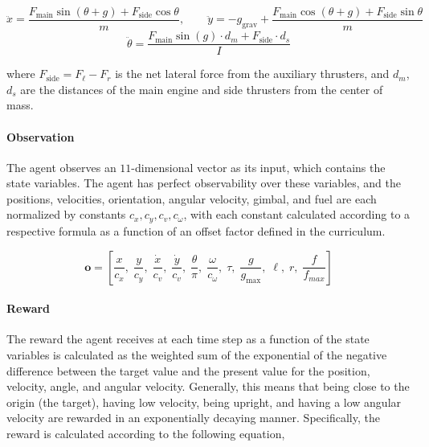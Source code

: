\documentclass{article}
\begin{document}
\begin{equation}
    \ddot{x} = \frac{F_\text{main} \sin(\theta + g) + F_\text{side} \cos\theta}{m}, \qquad
    \ddot{y} = -g_\text{grav} + \frac{F_\text{main} \cos(\theta + g) + F_\text{side} \sin\theta}{m}
    \label{eq:dynamics_xy}
\end{equation}
\begin{equation}
    \ddot{\theta} = \frac{F_\text{main} \sin(g) \cdot d_m + F_\text{side} \cdot d_s}{I}
    \label{eq:dynamics_theta}
\end{equation}

where $F_\text{side} = F_\ell - F_r$ is the net lateral force from the auxiliary thrusters, and $d_m$, $d_s$ are the distances of the main engine and side thrusters from the center of mass.

\paragraph{Observation}

The agent observes an $11$-dimensional vector as its input, which contains the state variables. The agent has perfect observability over these variables, and the positions, velocities, orientation, angular velocity, gimbal, and fuel are each normalized by constants $c_x, c_y, c_v, c_{\omega}$, with each constant calculated according to a respective formula as a function of an offset factor defined in the curriculum.

\begin{equation}
    \mathbf{o} = \left[\frac{x}{c_x},\; \frac{y}{c_y},\; \frac{\dot{x}}{c_v},\; \frac{\dot{y}}{c_v},\; \frac{\theta}{\pi},\; \frac{\omega}{c_\omega},\; \tau,\; \frac{g}{g_\text{max}},\; \ell,\; r,\; \frac{f}{f_{max}}\right]
\end{equation}

\paragraph{Reward}

The reward the agent receives at each time step as a function of the state variables is calculated as the weighted sum of the exponential of the negative difference between the target value and the present value for the position, velocity, angle, and angular velocity. Generally, this means that being close to the origin (the target), having low velocity, being upright, and having a low angular velocity are rewarded in an exponentially decaying manner. Specifically, the reward is calculated according to the following equation,
\end{document}
